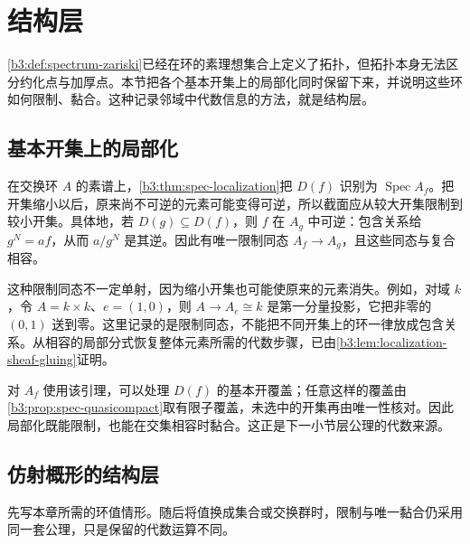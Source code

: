 
\section{结构层}
\label{b3:sec:2401}


%
%
%

\cref{b3:def:spectrum-zariski}已经在环的素理想集合上定义了拓扑，但拓扑本身无法区分约化点与加厚点。本节把各个基本开集上的局部化同时保留下来，并说明这些环如何限制、黏合。这种记录邻域中代数信息的方法，就是结构层。

\subsection{基本开集上的局部化}
\label{b3:subsec:2401:01}

在交换环 \(A\) 的素谱上，\cref{b3:thm:spec-localization}把 \(D(f)\) 识别为 \(\operatorname{Spec}A_f\)。把开集缩小以后，原来尚不可逆的元素可能变得可逆，所以截面应从较大开集限制到较小开集。具体地，若 \(D(g)\subseteq D(f)\)，则 \(f\) 在 \(A_g\) 中可逆：包含关系给 \(g^N=af\)，从而 \(a/g^N\) 是其逆。因此有唯一限制同态 \(A_f\rightarrow A_g\)，且这些同态与复合相容。

\ProseParagraphBreak
这种限制同态不一定单射，因为缩小开集也可能使原来的元素消失。例如，对域 \(k\)，令 \(A=k\times k\)、\(e=(1,0)\)，则 \(A\to A_e\cong k\) 是第一分量投影，它把非零的 \((0,1)\) 送到零。这里记录的是限制同态，不能把不同开集上的环一律放成包含关系。从相容的局部分式恢复整体元素所需的代数步骤，已由\cref{b3:lem:localization-sheaf-gluing}证明。

\ProseParagraphBreak
对 \(A_f\) 使用该引理，可以处理 \(D(f)\) 的基本开覆盖；任意这样的覆盖由\cref{b3:prop:spec-quasicompact}取有限子覆盖，未选中的开集再由唯一性核对。因此局部化既能限制，也能在交集相容时黏合。这正是下一小节层公理的代数来源。

\subsection{仿射概形的结构层}
\label{b3:subsec:2401:02}

先写本章所需的环值情形。随后将值换成集合或交换群时，限制与唯一黏合仍采用同一套公理，只是保留的代数运算不同。

